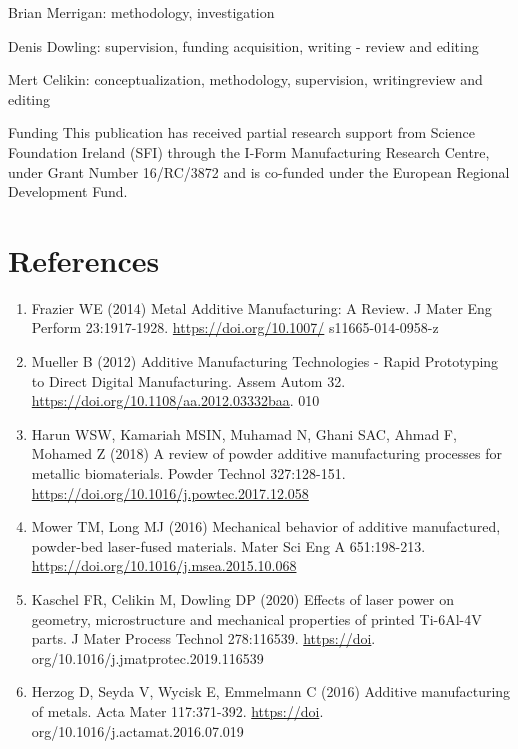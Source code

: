 \documentclass[10pt]{article}
\begin{document}
Brian Merrigan: methodology, investigation

Denis Dowling: supervision, funding acquisition, writing - review and editing

Mert Celikin: conceptualization, methodology, supervision, writingreview and editing

Funding This publication has received partial research support from Science Foundation Ireland (SFI) through the I-Form Manufacturing Research Centre, under Grant Number 16/RC/3872 and is co-funded under the European Regional Development Fund.

\section*{References}
\begin{enumerate}
  \item Frazier WE (2014) Metal Additive Manufacturing: A Review. J Mater Eng Perform 23:1917-1928. \href{https://doi.org/10.1007/}{https://doi.org/10.1007/} s11665-014-0958-z

  \item Mueller B (2012) Additive Manufacturing Technologies - Rapid Prototyping to Direct Digital Manufacturing. Assem Autom 32. \href{https://doi.org/10.1108/aa.2012.03332baa}{https://doi.org/10.1108/aa.2012.03332baa}. 010

  \item Harun WSW, Kamariah MSIN, Muhamad N, Ghani SAC, Ahmad F, Mohamed Z (2018) A review of powder additive manufacturing processes for metallic biomaterials. Powder Technol 327:128-151. \href{https://doi.org/10.1016/j.powtec.2017.12.058}{https://doi.org/10.1016/j.powtec.2017.12.058}

  \item Mower TM, Long MJ (2016) Mechanical behavior of additive manufactured, powder-bed laser-fused materials. Mater Sci Eng A 651:198-213. \href{https://doi.org/10.1016/j.msea.2015.10.068}{https://doi.org/10.1016/j.msea.2015.10.068}

  \item Kaschel FR, Celikin M, Dowling DP (2020) Effects of laser power on geometry, microstructure and mechanical properties of printed Ti-6Al-4V parts. J Mater Process Technol 278:116539. \href{https://doi}{https://doi}. org/10.1016/j.jmatprotec.2019.116539

  \item Herzog D, Seyda V, Wycisk E, Emmelmann C (2016) Additive manufacturing of metals. Acta Mater 117:371-392. \href{https://doi}{https://doi}. org/10.1016/j.actamat.2016.07.019


\end{enumerate}
\end{document}
